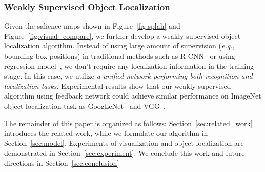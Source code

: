 \subsubsection*{Weakly Supervised Object Localization}
Given the salience maps shown in Figure~\ref{fig:splah} and Figure~\ref{fig:visual_compare}, we further develop a weakly supervised object localization algorithm. Instead of using large amount of supervision (\emph{e.g.}, bounding box positions) in traditional methods such as R-CNN~\cite{girshick2014rich} or using regression model~\cite{erhan2014scalable}, we don't require any localization information in the training stage. In this case, we utilize \emph{a unified network performing both recognition and localization tasks}. Experimental results show that our weakly supervised algorithm using feedback network could achieve similar performance on ImageNet object localization task as GoogLeNet~\cite{Szegedy2014Going} and VGG~\cite{Simonyan2014Very}.

The remainder of this paper is organized as follows: Section~\ref{sec:related_work} introduces the related work, while we formulate our algorithm in Section~\ref{sec:model}. Experiments of visualization and object localization are demonstrated in Section~\ref{sec:experiment}. We conclude this work and future directions in Section~\ref{sec:conclusion}

